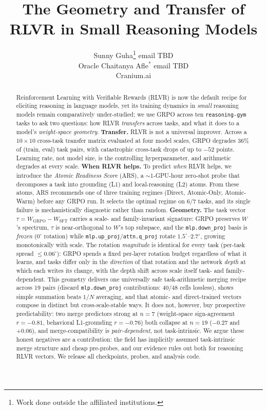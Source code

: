 \documentclass{article}
\title{The Geometry and Transfer of RLVR in Small Reasoning Models}
\author{%
  \name Sunny Guha\thanks{Work done outside the affiliated institutions.} \email email TBD \\
  \addr Oracle
  \AND
  \name Chaitanya Afle$^{*}$ \email email TBD \\
  \addr Cranium.ai
}
\newcommand{\Wsft}{W_{\mathrm{SFT}}}
\newcommand{\Wg}{W_{\mathrm{GRPO}}}
\newcommand{\dg}{^{\circ}}
\begin{document}
\maketitle

\begin{abstract}
Reinforcement Learning with Verifiable Rewards (RLVR) is now the default recipe for eliciting
reasoning in language models, yet its training dynamics in \emph{small} reasoning models remain
comparatively under-studied; we use GRPO across ten \texttt{reasoning-gym} tasks to ask two
questions: how RLVR \emph{transfers} across tasks, and what it does to a model's
\emph{weight-space geometry}.
\textbf{Transfer.} RLVR is not a universal improver. Across a $10\times 10$ cross-task transfer
matrix evaluated at four model scales, GRPO degrades $36\%$ of (train, eval) task pairs, with
catastrophic cross-task drops of up to $-52$ points. Learning rate, not model size, is the
controlling hyperparameter, and arithmetic degrades at every scale.
\textbf{When RLVR helps.} To predict \emph{when} RLVR helps, we introduce the \emph{Atomic
Readiness Score} (ARS), a $\sim$1-GPU-hour zero-shot probe that decomposes a task into grounding
(L1) and local-reasoning (L2) atoms. From these atoms, ARS recommends one of three training
regimes (Direct, Atomic-Only, Atomic-Warm) before any GRPO run. It selects the optimal regime on
$6/7$ tasks, and its single failure is mechanistically diagnostic rather than random.
\textbf{Geometry.} The task vector $\tau = \Wg-\Wsft$ carries a scale- and family-invariant
signature: GRPO preserves $W$'s spectrum, $\tau$ is near-orthogonal to $W$'s top subspace, and the
\texttt{mlp.down\_proj} basis is \emph{frozen} ($0\dg$ rotation) while
\texttt{mlp.up\_proj}/\texttt{attn.q\_proj} rotate $1.5\dg$--$2.7\dg$, growing monotonically with
scale. The rotation \emph{magnitude} is identical for every task (per-task spread $\leq0.06\dg$):
GRPO spends a fixed per-layer rotation budget regardless of what it learns, and tasks differ only in
the \emph{direction} of that rotation and the network \emph{depth} at which each writes its change,
with the depth shift across scale itself task- and family-dependent. This geometry delivers one universally safe task-arithmetic merging recipe across 19
pairs (discard \texttt{mlp.down\_proj} contributions: 40/48 cells lossless), shows simple summation
beats $1/N$ averaging, and that atomic- and direct-trained vectors compose in distinct but
cross-scale-stable ways. It does not, however, buy prospective predictability: two merge predictors
strong at $n{=}7$ (weight-space sign-agreement $r{=}{-}0.81$, behavioral L1-grounding
$r{=}{-}0.76$) both collapse at $n{=}19$ ($-0.27$ and $+0.06$), and merge-compatibility is
\emph{pair-dependent}, not task-intrinsic. We argue these honest negatives are a contribution: the
field has implicitly assumed task-intrinsic merge structure and cheap pre-probes, and our evidence
rules out both for reasoning RLVR vectors. We release all checkpoints, probes, and analysis code.
\end{abstract}
\end{document}
